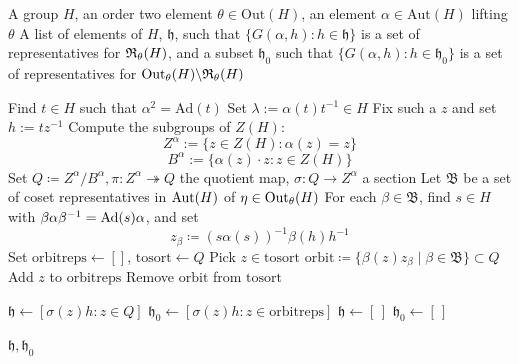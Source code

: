 \begin{algorithm}
\caption{Compute $\fR_\theta(H)$ and $\Out_{\theta}(H) \backslash \fR_{\theta}(H)$ for an order two element $\theta \in \mathrm{Out}(H)$}
\begin{algorithmic}[1]

\Require A group $H$, an order two element $\theta \in \mathrm{Out}(H)$, an element $\alpha \in \mathrm{Aut}(H)$ lifting $\theta$
\Ensure A list of elements of $H$, $\mathfrak{h}$, such that $\{G(\alpha, h) : h \in \mathfrak{h}\}$ is a set of representatives for $\fR_\theta(H)$, and a subset $\mathfrak{h}_0$ such that $\{G(\alpha, h) : h \in \mathfrak{h}_0\}$ is a set of representatives for $\Out_{\theta}(H) \backslash \fR_{\theta}(H)$

    \State Find $t \in H$ such that $\alpha^2 = \mathrm{Ad}(t)$
    \State Set $\lambda := \alpha(t) t^{-1} \in H$
        \State Fix such a $z$ and set $h := tz^{-1}$
        \State Compute the subgroups of $Z(H)$:
        \[
            Z^\alpha := \{ z \in Z(H) : \alpha(z) = z \}
        \]
        \[
            B^\alpha := \{ \alpha(z) \cdot z : z \in Z(H) \}
        \]
        \State Set $Q \coloneqq Z^\alpha / B^\alpha, \pi \colon Z^{\alpha} \twoheadrightarrow Q$ the quotient map, $\sigma \colon Q \rightarrow Z^{\alpha}$ a section
        \State Let $\mathfrak{B}$ be a set of coset representatives in $\operatorname{Aut}(H)$ of $\eta \in \operatorname{Out}_{\theta}(H)$
        \State For each $\beta \in \mathfrak{B}$, find $s \in H$ with $\beta \alpha \beta^{-1} = \operatorname{Ad}(s) \alpha$, and set
        \[
            z_{\beta} \coloneqq (s \alpha(s))^{-1}\beta(h) h^{-1}
        \]
        \State Set $\mathrm{orbitreps} \leftarrow []$, $\mathrm{tosort} \leftarrow Q$
          \State Pick $z \in \mathrm{tosort}$
          \State $\mathrm{orbit} \coloneqq \{\beta(z)z_{\beta} \mid \beta \in \mathfrak{B}\} \subset Q$
          \State Add $z$ to $\mathrm{orbitreps}$
          \State Remove $\mathrm{orbit}$ from $\mathrm{tosort}$
        \EndWhile

        \State $\mathfrak{h} \leftarrow [\sigma(z)h : z \in Q]$
        \State $\mathfrak{h}_0 \leftarrow [\sigma(z)h : z \in \mathrm{orbitreps}]$
    \Else
        \State $\mathfrak{h} \leftarrow [\,]$
        \State $\mathfrak{h}_0 \leftarrow [\,]$
    \EndIf

\Return $\mathfrak{h}, \mathfrak{h}_0$

\end{algorithmic}
\end{algorithm}

